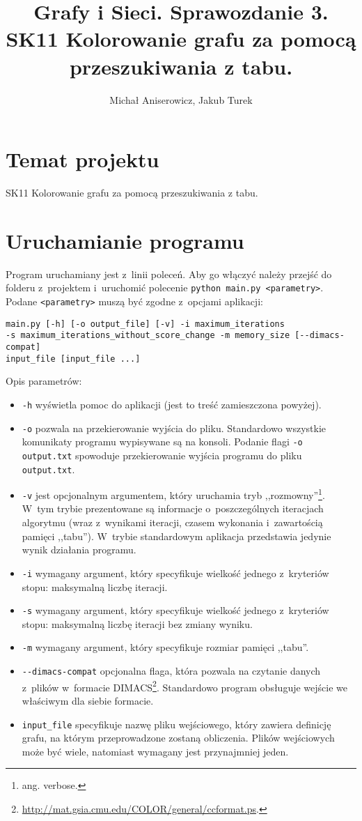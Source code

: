 \documentclass[a4paper,10pt]{article}
\title{Grafy i Sieci. Sprawozdanie 3. \\ \small{SK11 Kolorowanie grafu za pomocą przeszukiwania z tabu.}}
\author{Michał Aniserowicz, Jakub Turek}
\date{}
\begin{document}
\maketitle

\section*{Temat projektu}

SK11 Kolorowanie grafu za pomocą przeszukiwania z tabu.

\section*{Uruchamianie programu}

Program uruchamiany jest z~linii poleceń. Aby go włączyć należy przejść do folderu z~projektem i~uruchomić polecenie \verb+python main.py <parametry>+. Podane \verb+<parametry>+ muszą być zgodne z~opcjami aplikacji:

\begin{verbatim}
main.py [-h] [-o output_file] [-v] -i maximum_iterations
-s maximum_iterations_without_score_change -m memory_size [--dimacs-compat]
input_file [input_file ...]
\end{verbatim}

Opis parametrów:

\begin{itemize}
    \item \verb+-h+ wyświetla pomoc do aplikacji (jest to treść zamieszczona powyżej).
    \item \verb+-o+ pozwala na przekierowanie wyjścia do pliku. Standardowo wszystkie komunikaty programu wypisywane są na konsoli. Podanie flagi \verb+-o output.txt+ spowoduje przekierowanie wyjścia programu do pliku \verb+output.txt+.
    \item \verb+-v+ jest opcjonalnym argumentem, który uruchamia tryb ,,rozmowny''\footnote{ang. verbose.}. W~tym trybie prezentowane są informacje o~poszczególnych iteracjach algorytmu (wraz z~wynikami iteracji, czasem wykonania i~zawartością pamięci ,,tabu''). W~trybie standardowym aplikacja przedstawia jedynie wynik działania programu.
    \item \verb+-i+ wymagany argument, który specyfikuje wielkość jednego z~kryteriów stopu: maksymalną liczbę iteracji. 
    \item \verb+-s+ wymagany argument, który specyfikuje wielkość jednego z~kryteriów stopu: maksymalną liczbę iteracji bez zmiany wyniku.
    \item \verb+-m+ wymagany argument, który specyfikuje rozmiar pamięci ,,tabu''.
    \item \verb+--dimacs-compat+ opcjonalna flaga, która pozwala na czytanie danych z~plików w~formacie DIMACS\footnote{\url{http://mat.gsia.cmu.edu/COLOR/general/ccformat.ps}.}. Standardowo program obsługuje wejście we właściwym dla siebie formacie.
    \item \verb+input_file+ specyfikuje nazwę pliku wejściowego, który zawiera definicję grafu, na którym przeprowadzone zostaną obliczenia. Plików wejściowych może być wiele, natomiast wymagany jest przynajmniej jeden.
 \end{itemize}
\end{document}
